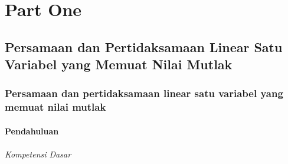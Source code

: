 \documentclass[11pt,fleqn]{book} %
\begin{document}


\pagestyle{empty} %

\tableofcontents %

\cleardoublepage %

\pagestyle{fancy} %


\part{Part One}



\chapter{Persamaan dan Pertidaksamaan Linear Satu Variabel yang Memuat Nilai Mutlak}

\section{Persamaan dan pertidaksamaan linear satu variabel yang memuat nilai mutlak}

\noindent \textbf{}


\subsection{ Pendahuluan}


\paragraph{ Kompetensi Dasar}
\end{document}
